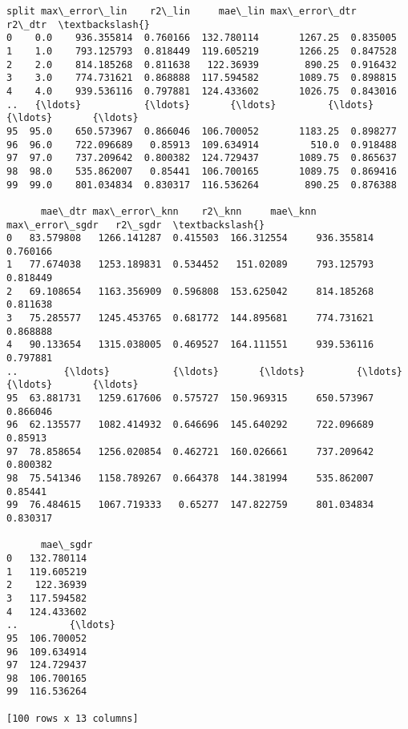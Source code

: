 \documentclass[11pt]{article}
\makeatletter
\newcommand{\boxspacing}{\kern\kvtcb@left@rule\kern\kvtcb@boxsep}
\newcommand{\prompt}[4]{
        {\ttfamily\llap{{\color{#2}[#3]:\hspace{3pt}#4}}\vspace{-\baselineskip}}
    }
\makeatother
\begin{document}
            \begin{tcolorbox}[breakable, size=fbox, boxrule=.5pt, pad at break*=1mm, opacityfill=0]
\prompt{Out}{outcolor}{94}{\boxspacing}
\begin{Verbatim}[commandchars=\\\{\}]
   split max\_error\_lin    r2\_lin     mae\_lin max\_error\_dtr    r2\_dtr  \textbackslash{}
0    0.0    936.355814  0.760166  132.780114       1267.25  0.835005
1    1.0    793.125793  0.818449  119.605219       1266.25  0.847528
2    2.0    814.185268  0.811638   122.36939        890.25  0.916432
3    3.0    774.731621  0.868888  117.594582       1089.75  0.898815
4    4.0    939.536116  0.797881  124.433602       1026.75  0.843016
..   {\ldots}           {\ldots}       {\ldots}         {\ldots}           {\ldots}       {\ldots}
95  95.0    650.573967  0.866046  106.700052       1183.25  0.898277
96  96.0    722.096689   0.85913  109.634914         510.0  0.918488
97  97.0    737.209642  0.800382  124.729437       1089.75  0.865637
98  98.0    535.862007   0.85441  106.700165       1089.75  0.869416
99  99.0    801.034834  0.830317  116.536264        890.25  0.876388

      mae\_dtr max\_error\_knn    r2\_knn     mae\_knn max\_error\_sgdr   r2\_sgdr  \textbackslash{}
0   83.579808   1266.141287  0.415503  166.312554     936.355814  0.760166
1   77.674038   1253.189831  0.534452   151.02089     793.125793  0.818449
2   69.108654   1163.356909  0.596808  153.625042     814.185268  0.811638
3   75.285577   1245.453765  0.681772  144.895681     774.731621  0.868888
4   90.133654   1315.038005  0.469527  164.111551     939.536116  0.797881
..        {\ldots}           {\ldots}       {\ldots}         {\ldots}            {\ldots}       {\ldots}
95  63.881731   1259.617606  0.575727  150.969315     650.573967  0.866046
96  62.135577   1082.414932  0.646696  145.640292     722.096689   0.85913
97  78.858654   1256.020854  0.462721  160.026661     737.209642  0.800382
98  75.541346   1158.789267  0.664378  144.381994     535.862007   0.85441
99  76.484615   1067.719333   0.65277  147.822759     801.034834  0.830317

      mae\_sgdr
0   132.780114
1   119.605219
2    122.36939
3   117.594582
4   124.433602
..         {\ldots}
95  106.700052
96  109.634914
97  124.729437
98  106.700165
99  116.536264

[100 rows x 13 columns]
\end{Verbatim}
\end{tcolorbox}
        
\end{document}
